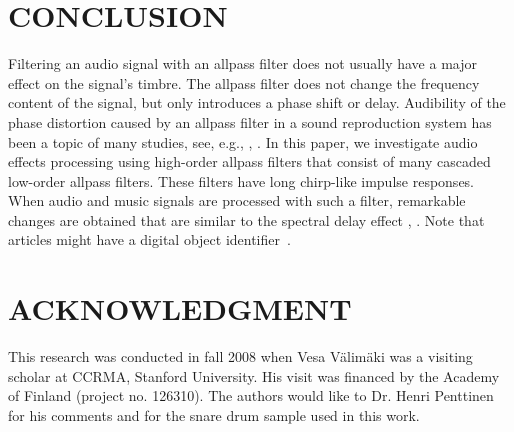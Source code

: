 \documentclass{aes2e}
\begin{document}
\section{CONCLUSION}
Filtering an audio signal with an allpass filter does not usually have a major effect on the signal's timbre. The allpass filter does not change the frequency content of the signal, but only introduces a phase shift or delay. Audibility of the phase distortion caused by an allpass filter in a sound reproduction system has been a topic of many studies, see, e.g., \cite{DEK1}, \cite{DEK2}. In this paper, we investigate audio effects processing using high-order allpass filters that consist of many cascaded low-order allpass filters. These filters have long chirp-like impulse responses. When audio and music signals are processed with such a filter, remarkable changes are obtained that are similar to the spectral delay effect  \cite{DEK3}, \cite{DEK4}. Note that articles might have a digital object identifier~\cite{DEK5}.

\section{ACKNOWLEDGMENT}
This research was conducted in fall 2008 when Vesa V\"alim\"aki was a visiting scholar at CCRMA, Stanford University. His visit was financed by the Academy of Finland (project no. 126310). The authors would like to Dr. Henri Penttinen for his comments and for the snare drum sample used in this work.




%
%
%
%
%
%
%  
\end{document}
